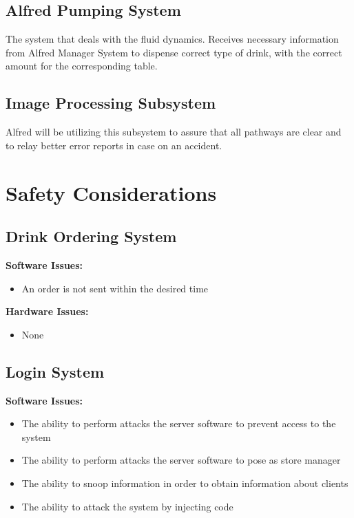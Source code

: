 \documentclass [10pt]{article}
\begin{document}
\subsection{Alfred Pumping System}
The system that deals with the fluid dynamics. Receives necessary information from Alfred Manager System to dispense correct type of drink, with the correct amount for the corresponding table. 

\subsection{Image Processing Subsystem}
Alfred will be utilizing this subsystem to assure that all pathways are clear and to relay better error reports in case on an accident.




\section{Safety Considerations}

\subsection{Drink Ordering System}
	\textbf{Software Issues:}
		\begin {itemize}
			\item An order is not sent within the desired time
		\end {itemize}
		
	\textbf{Hardware Issues:}
		\begin {itemize}
			\item None
		\end {itemize}

\subsection{Login System}
	\textbf{Software Issues:}
		\begin {itemize}
			\item The ability to perform attacks the server software to prevent access to the system
			\item The ability to perform attacks the server software to pose as store manager
			\item The ability to snoop information in order to obtain information about clients
			\item The ability to attack the system by injecting code
		\end {itemize}
		
\end{document}
